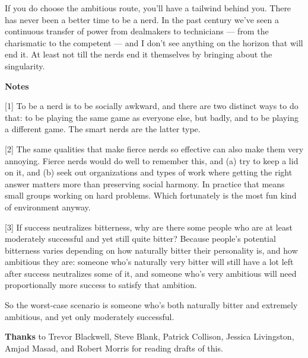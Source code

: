 If you do choose the ambitious
                  route, you'll have a tailwind behind you. There has never been
                  a better time to be a nerd. In the past century we've seen a
                  continuous transfer of power from dealmakers to technicians
                  --- from the charismatic to the competent --- and I
                  don't see anything on the horizon that will end it. At least
                  not till the nerds end it themselves by bringing about the
                  singularity.









\textbf{Notes}

[1] To be a nerd is to be socially awkward, and there are two
                  distinct ways to do that: to be playing the same game as
                  everyone else, but badly, and to be playing a different game.
                  The smart nerds are the latter type.

[2] The same qualities that make fierce nerds so effective can
                  also make them very annoying. Fierce nerds would do well to
                  remember this, and (a) try to keep a lid on it, and (b) seek
                  out organizations and types of work where getting the right
                  answer matters more than preserving social harmony. In
                  practice that means small groups working on hard problems.
                  Which fortunately is the most fun kind of environment
                  anyway.

[3] If success neutralizes bitterness, why are there some
                  people who are at least moderately successful and yet still
                  quite bitter? Because people's potential bitterness varies
                  depending on how naturally bitter their personality is, and
                  how ambitious they are: someone who's naturally very bitter
                  will still have a lot left after success neutralizes some of
                  it, and someone who's very ambitious will need proportionally
                  more success to satisfy that ambition.

So the
                  worst-case scenario is someone who's both naturally bitter and
                  extremely ambitious, and yet only moderately successful.




                  \textbf{Thanks} to Trevor Blackwell, Steve Blank, Patrick
                  Collison, Jessica Livingston, Amjad Masad, and Robert Morris
                  for reading drafts of this.


              
            
          
